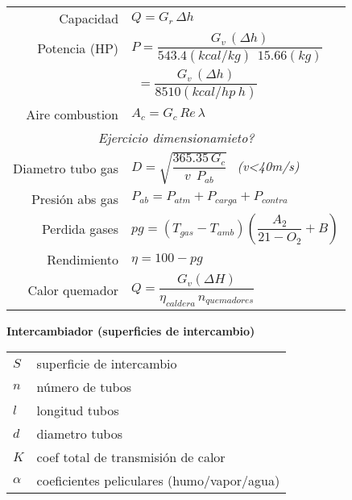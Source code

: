 \documentclass[11pt,a4paper]{article}
\begin{document}
\begin{cajita}
\begin{multicols}{2}
		\begin{tabular}{r l}
			Capacidad  & $Q=G_{r} \, \Delta h$\\
			Potencia  (HP) & $P=\dfrac{G_{v}\,\left(\Delta h\right)}{543.4(kcal/kg)~~15.66(kg)}~~$\\
			&$~~=\dfrac{G_{v}\,\left(\Delta h\right)}{8510 (kcal/hp~h)}$\\[0.4cm]
			Aire combustion& $A_{c}=G_{c}\,Re\,\lambda$\\
			\multicolumn{2}{c}{\textsl{Ejercicio dimensionamieto?}}\\
			Diametro tubo gas & $D=\sqrt{\dfrac{365.35\,G_{c}}{v~~P_{ab}}}~~$ \textit{(v<40m/s)}\\
			Presión abs gas& $P_{ab}=P_{atm}+P_{carga}+P_{contra}$\\
			Perdida gases & $pg=(T_{gas}-T_{amb})\left(\dfrac{A_{2}}{21-O_{2}}+B\right)$\\
			Rendimiento  & $ \eta=100-pg$\\
			Calor quemador& $Q=\dfrac{G_{v}(\Delta H)}{\eta_{caldera} \, n_{quemadores}}$\\
		\end{tabular}
	\end{multicols}

		\begin{center}
			\textbf{Intercambiador (superficies de intercambio)}
		\end{center}

		\begin{multicols}{2}
			\renewcommand{\arraystretch}{1}
			\begin{tabular}{@{}p{1cm}@{}@{}p{7cm}@{}}
				$S$ & superficie de intercambio\\
				$n$ & número de tubos\\
				$l$ & longitud tubos\\
				$d$& diametro tubos\\
				$K$ & coef total de transmisión de calor\\
				$\alpha$ & coeficientes peliculares \break (humo/vapor/agua)\\
			\end{tabular}
			

\end{multicols}
\end{cajita}
\end{document}
